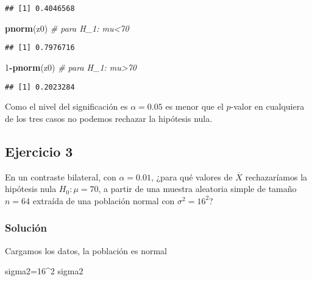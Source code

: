\documentclass[
]{article}
\newenvironment{Shaded}{\begin{snugshade}}{\end{snugshade}}
\newcommand{\CommentTok}[1]{\textcolor[rgb]{0.56,0.35,0.01}{\textit{#1}}}
\newcommand{\DecValTok}[1]{\textcolor[rgb]{0.00,0.00,0.81}{#1}}
\newcommand{\KeywordTok}[1]{\textcolor[rgb]{0.13,0.29,0.53}{\textbf{#1}}}
\newcommand{\NormalTok}[1]{#1}
\newcommand{\OperatorTok}[1]{\textcolor[rgb]{0.81,0.36,0.00}{\textbf{#1}}}
\begin{document}
\begin{verbatim}
## [1] 0.4046568
\end{verbatim}

\begin{Shaded}
\begin{Highlighting}[]
\KeywordTok{pnorm}\NormalTok{(z0) }\CommentTok{# para H_1: mu<70}
\end{Highlighting}
\end{Shaded}

\begin{verbatim}
## [1] 0.7976716
\end{verbatim}

\begin{Shaded}
\begin{Highlighting}[]
\DecValTok{1}\OperatorTok{-}\KeywordTok{pnorm}\NormalTok{(z0) }\CommentTok{# para H_1: mu>70}
\end{Highlighting}
\end{Shaded}

\begin{verbatim}
## [1] 0.2023284
\end{verbatim}

Como el nivel del significación es \(\alpha=0.05\) es menor que el
\(p\)-valor en cualquiera de los tres casos no podemos rechazar la
hipótesis nula.

\hypertarget{ejercicio-3}{%
\subsection{Ejercicio 3}\label{ejercicio-3}}

En un contraste bilateral, con \(\alpha=0.01\), ¿para qué valores de
\(\overline{X}\) rechazaríamos la hipótesis nula \(H_{0}:\mu=70\), a
partir de una muestra aleatoria simple de tamaño \(n=64\) extraída de
una población normal con \(\sigma^2=16^2\)?

\hypertarget{soluciuxf3n-2}{%
\subsubsection{Solución}\label{soluciuxf3n-2}}

Cargamos los datos, la población es normal

\begin{Shaded}
\begin{Highlighting}[]
\NormalTok{sigma2=}\DecValTok{16}\OperatorTok{^}\DecValTok{2}
\NormalTok{sigma2}
\end{Highlighting}
\end{Shaded}
\end{document}
